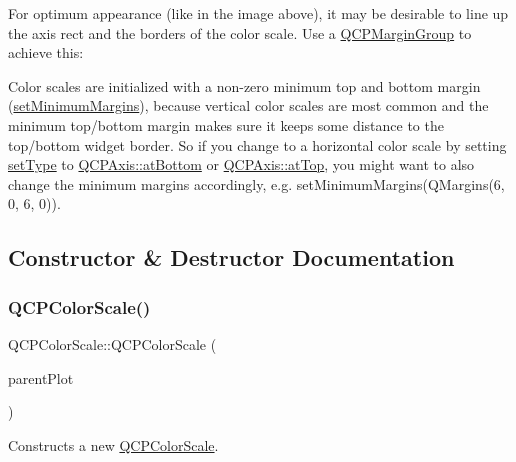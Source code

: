 For optimum appearance (like in the image above), it may be desirable to line up the axis rect and the borders of the color scale. Use a \mbox{\hyperlink{class_q_c_p_margin_group}{Q\+C\+P\+Margin\+Group}} to achieve this\+: 
\begin{DoxyCodeInclude}{0}
\end{DoxyCodeInclude}
 Color scales are initialized with a non-\/zero minimum top and bottom margin (\mbox{\hyperlink{class_q_c_p_layout_element_a0a8a17abc16b7923159fcc7608f94673}{set\+Minimum\+Margins}}), because vertical color scales are most common and the minimum top/bottom margin makes sure it keeps some distance to the top/bottom widget border. So if you change to a horizontal color scale by setting \mbox{\hyperlink{class_q_c_p_color_scale_a1bf9bdb291927c422dd66b404b206f1f}{set\+Type}} to \mbox{\hyperlink{class_q_c_p_axis_ae2bcc1728b382f10f064612b368bc18aa220d68888516b6c3b493d144f1ba438f}{Q\+C\+P\+Axis\+::at\+Bottom}} or \mbox{\hyperlink{class_q_c_p_axis_ae2bcc1728b382f10f064612b368bc18aac0ece2b680d3f545e701f75af1655977}{Q\+C\+P\+Axis\+::at\+Top}}, you might want to also change the minimum margins accordingly, e.\+g. {\ttfamily set\+Minimum\+Margins(\+Q\+Margins(6, 0, 6, 0))}. 

\subsection{Constructor \& Destructor Documentation}
\mbox{\label{class_q_c_p_color_scale_aa8debce1be38b54287c04d4f584394b4}} 
\subsubsection{\texorpdfstring{QCPColorScale()}{QCPColorScale()}}
{\footnotesize\ttfamily Q\+C\+P\+Color\+Scale\+::\+Q\+C\+P\+Color\+Scale (\begin{DoxyParamCaption}\item[{\mbox{\hyperlink{class_q_custom_plot}{Q\+Custom\+Plot}} $\ast$}]{parent\+Plot }\end{DoxyParamCaption})\hspace{0.3cm}{\ttfamily [explicit]}}

Constructs a new \mbox{\hyperlink{class_q_c_p_color_scale}{Q\+C\+P\+Color\+Scale}}. \mbox{\label{class_q_c_p_color_scale_a49d8d2d155c15fa315fdc0427194c9ea}} 
